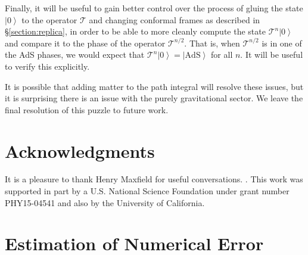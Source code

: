 \documentclass[letterpaper,12pt]{article}
\newcommand{\ket}[1]{\left| #1\right>}
\begin{document}
 Finally, it will be useful to gain better control over the process of gluing the state $\ket 0$ to the operator $\mathcal T$ and changing conformal frames as described in \S\ref{section:replica}, in order to be able to more cleanly compute the state $\mathcal T^n \ket 0$ and compare it to the phase of the operator $\mathcal T^{n/2}$. That is, when $\mathcal T^{n/2}$ is in one of the AdS phases, we would expect that $\mathcal T^n\ket 0 = \ket{\text{AdS}}$ for all $n$. It will be useful to verify this explicitly.

 It is possible that adding matter to the path integral will resolve these issues, but it is surprising there is an issue with the purely gravitational sector. We leave the final resolution of this puzzle to future work.


\section*{Acknowledgments}
It is a pleasure to thank Henry Maxfield for useful conversations. . This work was supported in part by a U.S. National Science Foundation under grant number PHY15-04541 and also by the University of California. 

\appendix





\section{Estimation of Numerical Error}
\label{appendix:error}
\end{document}
